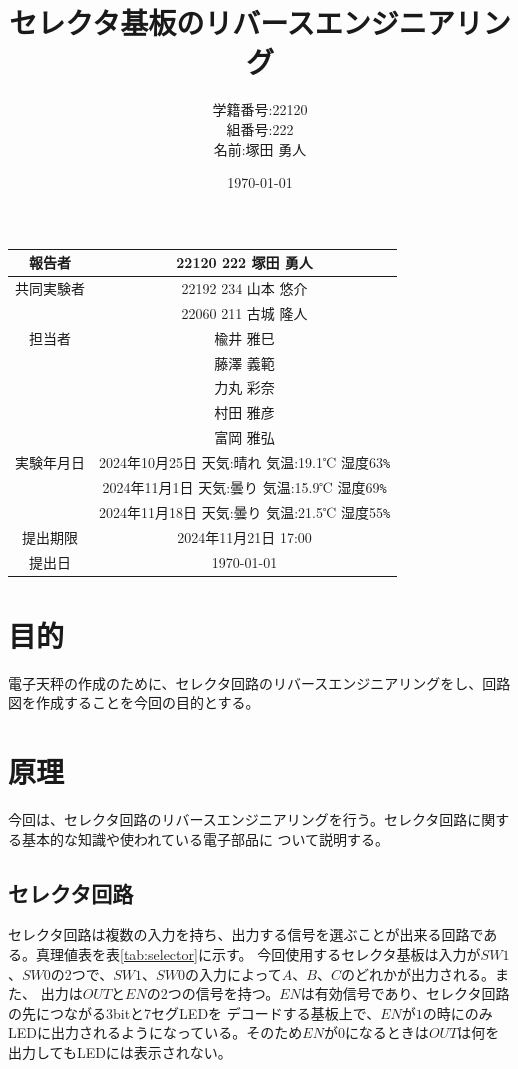 \documentclass[a4paper,11pt,dvipdfmx]{jsarticle}
\begin{document}
\begin{table}[b]
  \centering
  \begin{tabular}{|c|c|}
    \hline
    報告者     & 22120 222 塚田 勇人 \\
    \hline
    共同実験者 & 22192 234 山本 悠介  \\ & 22060 211 古城 隆人\\
    \hline
    担当者     & 楡井 雅巳 \\
              &  藤澤 義範\\
    &力丸 彩奈\\
    &村田 雅彦\\
    &富岡 雅弘\\
    \hline
    実験年月日 & 2024年10月25日 天気:晴れ 気温:19.1℃ 湿度63\verb#%#\\
    & 2024年11月1日 天気:曇り 気温:15.9℃ 湿度69\verb#%#\\
    & 2024年11月18日 天気:曇り 気温:21.5℃ 湿度55\verb#%#\\
    \hline
    提出期限   & 2024年11月21日 17:00  \\
    \hline
    提出日     & \today              \\
    \hline
  \end{tabular}
\end{table}

\title{セレクタ基板のリバースエンジニアリング}
\author{学籍番号:22120 \\ 組番号:222 \\名前:塚田 勇人}
\date{\today}
\maketitle

\newpage

\section{目的}
電子天秤の作成のために、セレクタ回路のリバースエンジニアリングをし、回路図を作成することを今回の目的とする。

\section{原理}
今回は、セレクタ回路のリバースエンジニアリングを行う。セレクタ回路に関する基本的な知識や使われている電子部品に
ついて説明する。

\subsection{セレクタ回路}
セレクタ回路は複数の入力を持ち、出力する信号を選ぶことが出来る回路である。真理値表を表\ref{tab:selector}に示す。
今回使用するセレクタ基板は入力が$SW1$、$SW0$の2つで、$SW1$、$SW0$の入力によって$A$、$B$、$C$のどれかが出力される。また、
出力は$OUT$と$EN$の2つの信号を持つ。$EN$は有効信号であり、セレクタ回路の先につながる3bitと7セグLEDを
デコードする基板上で、$EN$が$1$の時にのみLEDに出力されるようになっている。そのため$EN$が$0$になるときは$OUT$は何を
出力してもLEDには表示されない。
\end{document}
